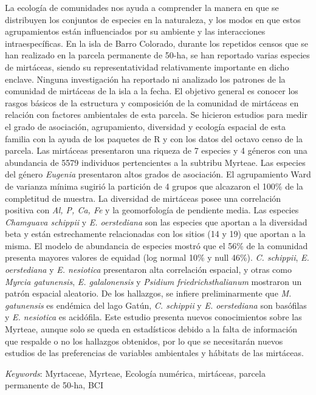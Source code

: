 \documentclass[11pt,]{article}
\renewenvironment{abstract}
 {{%
    \setlength{\leftmargin}{0mm}
    \setlength{\rightmargin}{\leftmargin}%
  }%
  \relax}
 {\endlist}
\begin{document}
\begin{abstract}

    \hbox{\vrule height .2pt width 39.14pc}

    \vskip 8.5pt %

\noindent La ecología de comunidades nos ayuda a comprender la manera en que se
distribuyen los conjuntos de especies en la naturaleza, y los modos en
que estos agrupamientos están influenciados por su ambiente y las
interacciones intraespecíficas. En la isla de Barro Colorado, durante
los repetidos censos que se han realizado en la parcela permanente de
50-ha, se han reportado varias especies de mirtáceas, siendo su
representatividad relativamente importante en dicho enclave. Ninguna
investigación ha reportado ni analizado los patrones de la comunidad de
mirtáceas de la isla a la fecha. El objetivo general es conocer los
rasgos básicos de la estructura y composición de la comunidad de
mirtáceas en relación con factores ambientales de esta parcela. Se
hicieron estudios para medir el grado de asociación, agrupamiento,
diversidad y ecología espacial de esta familia con la ayuda de los
paquetes de R y con los datos del octavo censo de la parcela. Las
mirtáceas presentaron una riqueza de 7 especies y 4 géneros con una
abundancia de 5579 individuos pertencientes a la subtribu Myrteae. Las
especies del género \emph{Eugenia} presentaron altos grados de
asociación. El agrupamiento Ward de varianza mínima sugirió la partición
de 4 grupos que alcazaron el 100\% de la completitud de muestra. La
diversidad de mirtáceas posee una correlación positiva con \emph{Al, P,
Ca, Fe} y la geomorfología de pendiente media. Las especies
\emph{Chamguava schippii} y \emph{E. oerstediana} son las especies que
aportan a la diversidad beta y están estrechamente relacionadas con los
sitios (14 y 19) que aportan a la misma. El modelo de abundancia de
especies mostró que el 56\% de la comunidad presenta mayores valores de
equidad (log normal 10\% y null 46\%). \emph{C. schippii}, \emph{E.
oerstediana} y \emph{E. nesiotica} presentaron alta correlación
espacial, y otras como \emph{Myrcia gatunensis}, \emph{E. galalonensis}
y \emph{Psidium friedrichsthalianum} mostraron un patrón espacial
aleatorio. De los hallazgos, se infiere preliminarmente que \emph{M.
gatunensis} es endémica del lago Gatún, \emph{C. schippii} y \emph{E.
oerstediana} son basófilas y \emph{E. nesiotica} es acidófila. Este
estudio presenta nuevos conocimientos sobre las Myrteae, aunque solo se
queda en estadísticos debido a la falta de información que respalde o no
los hallazgos obtenidos, por lo que se necesitarán nuevos estudios de
las preferencias de variables ambientales y hábitats de las mirtáceas.


\vskip 8.5pt \noindent \emph{Keywords}: Myrtaceae, Myrteae, Ecología numérica, mirtáceas, parcela permanente de
50-ha, BCI \par

    \hbox{\vrule height .2pt width 39.14pc}



\end{abstract}
\end{document}
